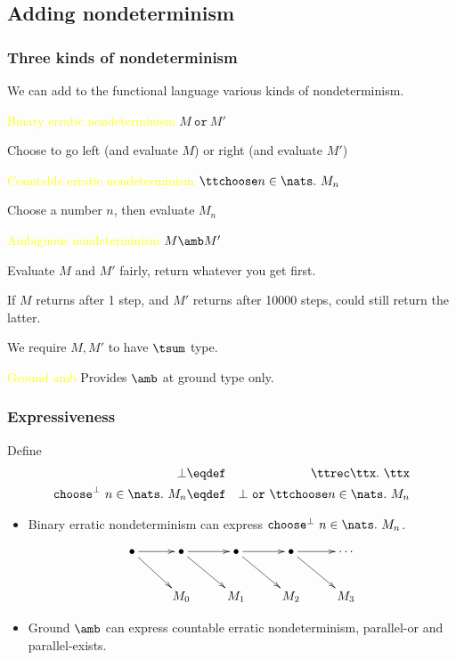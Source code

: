 \documentclass{beamer}
\newcommand{\ttor}{\ \mathtt{or}\ }
\newcommand{\yellow}[1]{\textcolor{yellow}{#1}}
\newcommand{\ttchoosebot}{\mathtt{choose}^{\bot}\ }
\begin{document}
\subsection{Adding nondeterminism}

\begin{frame}\frametitle{Three kinds of nondeterminism}
  
We can add to the functional language various kinds of nondeterminism.

\begin{block}{\yellow{Binary erratic nondeterminism} $M \ttor M'$}
  
  Choose to go left (and evaluate $M$) or right (and evaluate $M'$)
\end{block}

\begin{block}{\yellow{Countable erratic nondeterminism} $\ttchoose n \in \nats.\ M_{n}$}
  
  Choose a number $n$, then evaluate $M_{n}$
\end{block}

\begin{block}{\yellow{Ambiguous nondeterminism} $M \amb M'$}
  
  Evaluate $M$ and $M'$ fairly, return whatever you get first.
  
  If $M$ returns after 1 step, and $M'$ returns after 10000 steps, could still
  return the latter.
  
  We require $M,M'$ to have $\tsum$ type.
\end{block}

\begin{block}{\yellow{Ground amb}}
  Provides $\amb$ at ground type only.
\end{block}


\end{frame}

\begin{frame}\frametitle{Expressiveness}

Define
\begin{eqnarray*}
 \bot & \eqdef & \ttrec \ttx.\ \ttx \\
  \ttchoosebot n\in \nats.\  M_{n} & \eqdef & \bot \ttor \ttchoose n \in \nats.\ M_{n}
\end{eqnarray*}

\begin{itemize}
\item Binary erratic nondeterminism can express $\ttchoosebot n \in \nats.\ M_{n}$.

  \begin{displaymath}
    \xymatrix{
 \bullet \ar[r] \ar[dr] & \bullet \ar[r] \ar[dr]  & \bullet \ar[r]\ar[dr] & \bullet \ar[r] \ar[dr] & \cdots \\
 & M_{0} & M_{1} & M_{2} & M_{3}
}
  \end{displaymath}
  
\item  Ground $\amb$ can express countable erratic nondeterminism, parallel-or and
  parallel-exists.
\end{itemize}
\end{frame}
\end{document}
